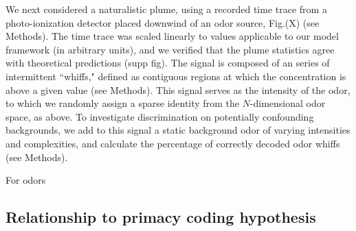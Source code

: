 We next considered a naturalistic plume, using a recorded time trace from a photo-ionization detector placed downwind of an odor source, Fig.(X) (see Methods). The time trace was scaled linearly to values applicable to our model framework (in arbitrary units), and we verified that the plume statistics agree with theoretical predictions  (supp fig). The signal is composed of an series of intermittent ``whiffs," defined as contiguous regions at which the concentration is above a given value (see Methods). This signal serves as the intensity of the odor, to which we randomly assign a sparse identity from the $N$-dimensional odor space, as above. To investigate discrimination on potentially confounding backgrounds, we add to this signal a static background odor of varying intensities and complexities, and calculate the percentage of correctly decoded odor whiffs (see Methods).

For odors 

\subsection{Relationship to primacy coding hypothesis}


